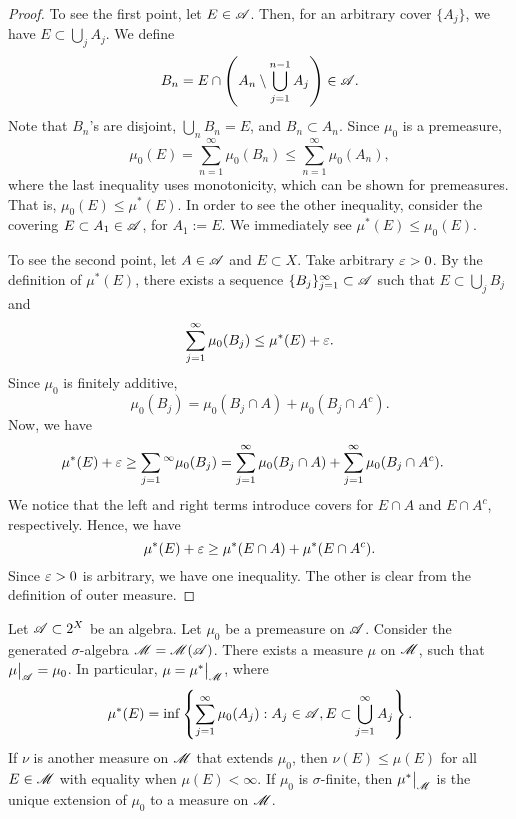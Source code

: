 \documentclass[12pt]{article} %
\begin{document}
\begin{proof}
    To see the first point, let $E \in \mathscr{A}$. Then, for an arbitrary cover $\{A_j\}$, we have $E \subset \bigcup_j A_j$. We define \[B_n = E \cap \left(A_n \setminus \bigcup_{j=1}^{n-1} A_{j} \right) \in \mathscr{A}.\] Note that $B_n$'s are disjoint, $\bigcup_n B_n = E$, and $B_n \subset A_n$. Since $\mu_0$ is a premeasure, \[\mu_0(E) = \sum_{n=1}^{\infty} \mu_0(B_n) \leq \sum_{n=1}^{\infty} \mu_0(A_n),\] where the last inequality uses monotonicity, which can be shown for premeasures. That is, $\mu_0(E) \leq \mu^*(E)$. In order to see the other inequality, consider the covering $E \subset A_1 \in \mathscr{A}$, for $A_1 := E$. We immediately see $\mu^*(E) \leq \mu_0(E)$.

    To see the second point, let $A \in \mathscr{A}$ and $E \subset X$. Take arbitrary $\varepsilon > 0$. By the definition of $\mu^*(E)$, there exists a sequence $\{B_j\}_{j=1}^{\infty} \subset \mathscr{A}$ such that $E \subset \bigcup_j B_j$ and \[\sum_{j=1}^{\infty} \mu_0(B_j) \leq \mu^*(E) + \varepsilon.\] Since $\mu_0$ is finitely additive, \[\mu_0(B_j) = \mu_0(B_j \cap A) + \mu_0(B_j \cap A^c).\] Now, we have \begin{align*}
        \mu^*(E) + \varepsilon \geq \sum_{j=1}{^\infty} \mu_0(B_j) &= \sum_{j=1}^{\infty} \mu_0(B_j \cap A) + \sum_{j=1}^{\infty} \mu_0(B_j \cap A^c).
    \end{align*}
    We notice that the left and right terms introduce covers for $E \cap A$ and $E \cap A^c$, respectively. Hence, we have \[\mu^*(E) + \varepsilon \geq \mu^*(E \cap A) + \mu^*(E \cap A^c).\] Since $\varepsilon > 0$ is arbitrary, we have one inequality. The other is clear from the definition of outer measure.
\end{proof}

\begin{theorem}\label{thm:premeasure-induced-measure}
    Let $\mathscr{A} \subset 2^X$ be an algebra. Let $\mu_0$ be a premeasure on $\mathscr{A}$. Consider the generated $\sigma$-algebra $\mathscr{M} = \mathscr{M}(\mathscr{A})$. There exists a measure $\mu$ on $\mathscr{M}$, such that $\restr{\mu}{\SA} = \mu_0$. In particular, $\mu = \restr{\mu^*}{\SM}$, where \[\mu^*(E) = \inf \left\{\sum_{j=1}^{\infty} \mu_0(A_j) : A_j \in \mathscr{A}, E \subset \bigcup_{j=1}^{\infty} A_j \right\}.\] If $\nu$ is another measure on $\mathscr{M}$ that extends $\mu_0$, then $\nu(E) \leq \mu(E)$ for all $E \in \mathscr{M}$ with equality when $\mu(E) < \infty$. If $\mu_0$ is $\sigma$-finite, then $\restr{\mu^*}{\SM}$ is the unique extension of $\mu_0$ to a measure on $\mathscr{M}$. 
\end{theorem}
\end{document}
